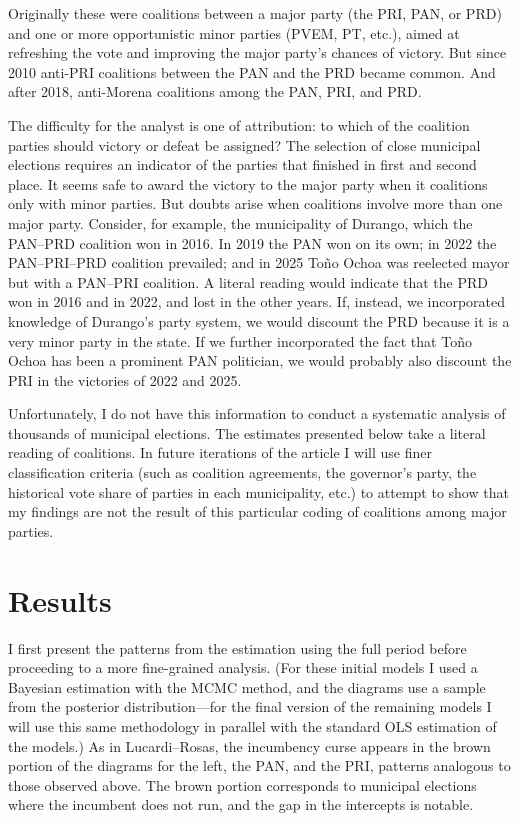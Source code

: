 \documentclass[letter,12pt]{article}
\begin{document}
Originally these were coalitions between a major party (the PRI, PAN, or PRD) and one or more opportunistic minor parties (PVEM, PT, etc.), aimed at refreshing the vote and improving the major party’s chances of victory. But since 2010 anti-PRI coalitions between the PAN and the PRD became common. And after 2018, anti-Morena coalitions among the PAN, PRI, and PRD.

The difficulty for the analyst is one of attribution: to which of the coalition parties should victory or defeat be assigned? The selection of close municipal elections requires an indicator of the parties that finished in first and second place. It seems safe to award the victory to the major party when it coalitions only with minor parties. But doubts arise when coalitions involve more than one major party. Consider, for example, the municipality of Durango, which the PAN--PRD coalition won in 2016. In 2019 the PAN won on its own; in 2022 the PAN--PRI--PRD coalition prevailed; and in 2025 Toño Ochoa was reelected mayor but with a PAN--PRI coalition. A literal reading would indicate that the PRD won in 2016 and in 2022, and lost in the other years. If, instead, we incorporated knowledge of Durango’s party system, we would discount the PRD because it is a very minor party in the state. If we further incorporated the fact that Toño Ochoa has been a prominent PAN politician, we would probably also discount the PRI in the victories of 2022 and 2025.

Unfortunately, I do not have this information to conduct a systematic analysis of thousands of municipal elections. The estimates presented below take a literal reading of coalitions. In future iterations of the article I will use finer classification criteria (such as coalition agreements, the governor’s party, the historical vote share of parties in each municipality, etc.) to attempt to show that my findings are not the result of this particular coding of coalitions among major parties.

\section{Results}

\noindent I first present the patterns from the estimation using the full period before proceeding to a more fine-grained analysis. (For these initial models I used a Bayesian estimation with the MCMC method, and the diagrams use a sample from the posterior distribution---for the final version of the remaining models I will use this same methodology in parallel with the standard OLS estimation of the models.) As in Lucardi--Rosas, the incumbency curse appears in the brown portion of the diagrams for the left, the PAN, and the PRI, patterns analogous to those observed above. The brown portion corresponds to municipal elections where the incumbent does not run, and the gap in the intercepts is notable.
\end{document}
